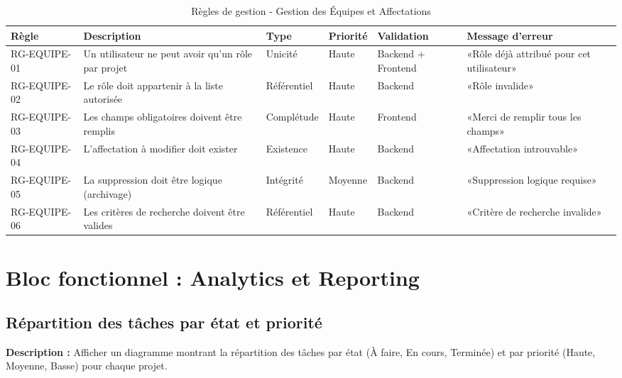     \begin{table}[H]
        \centering
\footnotesize
\begin{tabular}{|p{1.5cm}|p{3.5cm}|p{1.5cm}|p{1.5cm}|p{2cm}|p{2.5cm}|}
\hline
\textbf{Règle} & \textbf{Description} & \textbf{Type} & \textbf{Priorité} & \textbf{Validation} & \textbf{Message d'erreur} \\
\hline
RG-EQUIPE-01 & Un utilisateur ne peut avoir qu'un rôle par projet & Unicité & Haute & Backend + Frontend & «Rôle déjà attribué pour cet utilisateur» \\
\hline
RG-EQUIPE-02 & Le rôle doit appartenir à la liste autorisée & Référentiel & Haute & Backend & «Rôle invalide» \\
\hline
RG-EQUIPE-03 & Les champs obligatoires doivent être remplis & Complétude & Haute & Frontend & «Merci de remplir tous les champs» \\
\hline
RG-EQUIPE-04 & L'affectation à modifier doit exister & Existence & Haute & Backend & «Affectation introuvable» \\
            \hline
RG-EQUIPE-05 & La suppression doit être logique (archivage) & Intégrité & Moyenne & Backend & «Suppression logique requise» \\
            \hline
RG-EQUIPE-06 & Les critères de recherche doivent être valides & Référentiel & Haute & Backend & «Critère de recherche invalide» \\
            \hline
        \end{tabular}
\caption{Règles de gestion - Gestion des Équipes et Affectations}
\label{tab:rg_equipes}
    \end{table}




\section{Bloc fonctionnel : Analytics et Reporting}

\subsection{Répartition des tâches par état et priorité}
    \textbf{Description :} Afficher un diagramme montrant la répartition des tâches par état (À faire, En cours, Terminée) et par priorité (Haute, Moyenne, Basse) pour chaque projet.

